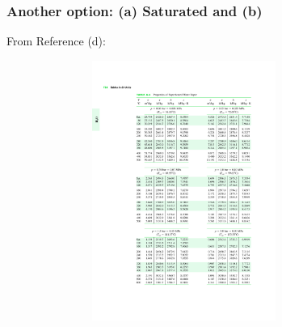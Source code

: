 \documentclass[10pt,compress,handout,unknownkeysallowed]{beamer}
\begin{document}
\begin{frame}
  \frametitle{Another option: (a) Saturated and (b) }
\scriptsize{From Reference (d):}\vspace{-.8cm}
   \begin{center}
   \begin{figure}
      \includegraphics[width=9.5cm,height=8.5cm,clip]{../Pics/Water_SuperheatedTable} 
   \end{figure}
   \end{center}
\end{frame}
\end{document}
